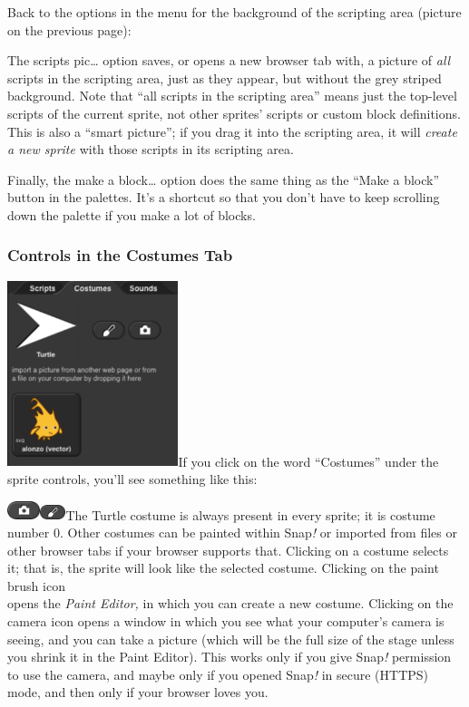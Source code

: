 Back to the options in the menu for the background of the scripting area
(picture on the previous page):

The scripts pic\ldots{} option saves, or opens a new browser tab with, a
picture of \emph{all} scripts in the scripting area, just as they
appear, but without the grey striped background. Note that ``all scripts
in the scripting area'' means just the top-level scripts of the current
sprite, not other sprites' scripts or custom block definitions. This is
also a ``smart picture''; if you drag it into the scripting area, it
will \emph{create a new sprite} with those scripts in its scripting
area.

Finally, the make a block\ldots{} option does the same thing as the
``Make a block'' button in the palettes. It's a shortcut so that you
don't have to keep scrolling down the palette if you make a lot of
blocks.

\subsubsection{Controls in the Costumes
Tab}\label{controls-in-the-costumes-tab}

\includegraphics[width=1.96319in,height=2.13194in]{media/image1082.png}If
you click on the word ``Costumes'' under the sprite controls, you'll see
something like this:

\includegraphics[width=0.37917in,height=0.21667in]{media/image1083.png}\includegraphics[width=0.29167in,height=0.16667in]{media/image1084.png}The
Turtle costume is always present in every sprite; it is costume number
0. Other costumes can be painted within Snap\emph{!} or imported from
files or other browser tabs if your browser supports that. Clicking on a
costume selects it; that is, the sprite will look like the selected
costume. Clicking on the paint brush icon\\
opens the \emph{Paint Editor,} in which you can create a new costume.
Clicking on the camera icon opens a window in which you see what your
computer's camera is seeing, and you can take a picture (which will be
the full size of the stage unless you shrink it in the Paint Editor).
This works only if you give Snap\emph{!} permission to use the camera,
and maybe only if you opened Snap\emph{!} in secure (HTTPS) mode, and
then only if your browser loves you.

